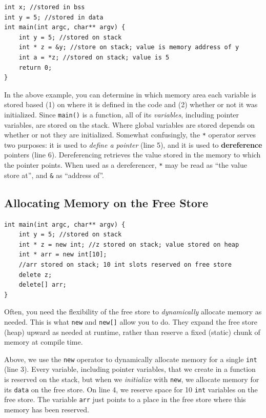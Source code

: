 \documentclass[12pt]{article}
\begin{document}
\begin{verbatim}
int x; //stored in bss
int y = 5; //stored in data
int main(int argc, char** argv) {
    int y = 5; //stored on stack
    int * z = &y; //store on stack; value is memory address of y
    int a = *z; //stored on stack; value is 5
    return 0;
}
\end{verbatim}
\label{code:pointers1}
In the above example, you can determine in which memory area each
variable is stored based (1) on where it is defined in the code and
(2) whether or not it was initialized.  Since \texttt{main()} is a
function, all of its \textit{variables}, including pointer variables,
are stored on the stack.  Where global variables are stored depends on
whether or not they are initialized.  Somewhat confusingly, the
\texttt{*} operator serves two purposes: it is used to \textit{define
  a pointer} (line 5), and it is used to \textbf{dereference} pointers
(line 6). Dereferencing retrieves the value stored in the memory to
which the pointer points. When used as a dereferencer, \texttt{*} may
be read as ``the value store at'', and \texttt{\&} as ``address of''.
\subsection{Allocating Memory on the Free Store}
\begin{verbatim}
int main(int argc, char** argv) {
    int y = 5; //stored on stack
    int * z = new int; //z stored on stack; value stored on heap
    int * arr = new int[10]; 
    //arr stored on stack; 10 int slots reserved on free store
    delete z;
    delete[] arr;
}
\end{verbatim}
\label{code:pointers2}

Often, you need the flexibility of the free store to
\textit{dynamically} allocate memory as needed. This is what
\texttt{new} and \texttt{new[]} allow you to do. They expand the free
store (heap) upward as needed at runtime, rather than reserve a fixed
(static) chunk of memory at compile time.

Above, we use the \texttt{new} operator to dynamically allocate memory
for a single \texttt{int} (line 3).  Every variable, including pointer
variables, that we create in a function is reserved on the stack, but
when we \textit{initialize} with \texttt{new}, we allocate memory for
its \texttt{data} on the free store.  On line 4, we reserve space for
10 \texttt{int} variables on the free store.  The variable
\texttt{arr} just points to a place in the free store where this
memory has been reserved.
\end{document}
